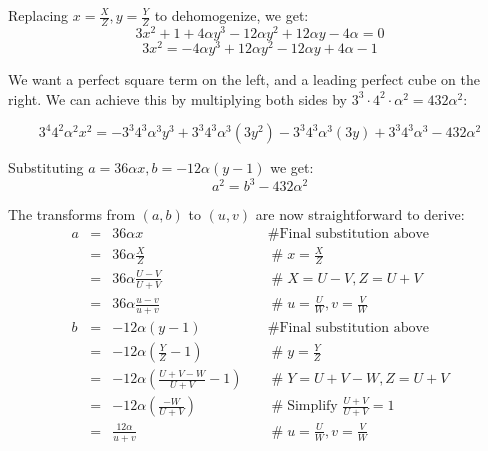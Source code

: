 \documentclass{article}
\begin{document}
Replacing $x=\frac{X}{Z}, y=\frac{Y}{Z}$ to dehomogenize, we get:
\[ 3x^2 + 1 + 4 \alpha y^3 - 12 \alpha y^2 + 12\alpha y - 4\alpha = 0 \]
\[ 3x^2 = -4\alpha y^3 + 12\alpha y^2 -12 \alpha y +4 \alpha -1 \]

We want a perfect square term on the left, and a leading perfect cube on the right. We can achieve
this by multiplying both sides by $3^3\cdot4^2\cdot \alpha^2 = 432\alpha^2$:

\[ 3^4 4^2 \alpha^2 x^2 = -3^3 4^3 \alpha^3 y^3 + 3^3 4^3 \alpha^3 (3y^2) - 3^3 4^3 \alpha^3(3 y) +3^3 4^3 \alpha^3 - 432\alpha^2 \]

Substituting $a=36\alpha x, b=-12\alpha(y-1)$ we get:
\[ a^2 = b^3 - 432\alpha^2 \]

The transforms from $(a,b)$ to $(u,v)$ are now straightforward to derive:
\begin{equation*}
	\begin{array}{llll}
		a & = & 36\alpha x & \quad \mathrel{\#} \text{Final substitution above} \\
		& = & 36 \alpha \frac{X}{Z} & \quad \mathrel{\#} x = \frac{X}{Z} \\
		& = & 36 \alpha \frac{U-V}{U+V}  & \quad \mathrel{\#} X = U - V, Z = U + V \\
		& = & 36 \alpha \frac{u-v}{u+v} & \quad \mathrel{\#} u = \frac{U}{W}, v = \frac{V}{W} \\
		b & = & -12 \alpha (y-1) & \quad \mathrel{\#} \text{Final substitution above} \\
		& = & -12 \alpha \left(\frac{Y}{Z} - 1 \right) & \quad \mathrel{\#} y = \frac{Y}{Z} \\
		& = & -12 \alpha \left(\frac{U+V-W}{U+V} - 1 \right) & \quad \mathrel{\#} Y = U+V-W, Z= U + V \\
		& = & -12 \alpha \left(\frac{-W}{U+V}\right) & \quad \mathrel{\#} \text{Simplify } \frac{U+V}{U+V}=1 \\
		& = & \frac{12 \alpha}{u+v} & \quad \mathrel{\#} u = \frac{U}{W}, v = \frac{V}{W} 
	\end{array}
\end{equation*}
\end{document}
